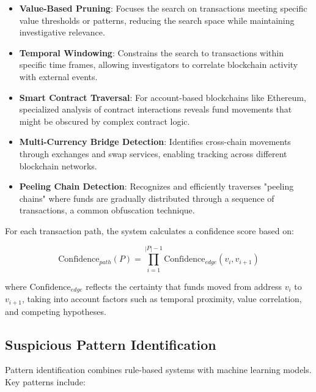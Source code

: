 \documentclass[conference]{IEEEtran}
\begin{document}
\begin{itemize}
    \item \textbf{Value-Based Pruning}: Focuses the search on transactions meeting specific value thresholds or patterns, reducing the search space while maintaining investigative relevance.
    
    \item \textbf{Temporal Windowing}: Constrains the search to transactions within specific time frames, allowing investigators to correlate blockchain activity with external events.
    
    \item \textbf{Smart Contract Traversal}: For account-based blockchains like Ethereum, specialized analysis of contract interactions reveals fund movements that might be obscured by complex contract logic.
    
    \item \textbf{Multi-Currency Bridge Detection}: Identifies cross-chain movements through exchanges and swap services, enabling tracking across different blockchain networks.
    
    \item \textbf{Peeling Chain Detection}: Recognizes and efficiently traverses "peeling chains" where funds are gradually distributed through a sequence of transactions, a common obfuscation technique.
\end{itemize}

For each transaction path, the system calculates a confidence score based on:

\begin{equation}
\text{Confidence}_{path}(P) = \prod_{i=1}^{|P|-1} \text{Confidence}_{edge}(v_i, v_{i+1})
\end{equation}

where $\text{Confidence}_{edge}$ reflects the certainty that funds moved from address $v_i$ to $v_{i+1}$, taking into account factors such as temporal proximity, value correlation, and competing hypotheses.

\subsection{Suspicious Pattern Identification}

Pattern identification combines rule-based systems with machine learning models. Key patterns include:
\end{document}
